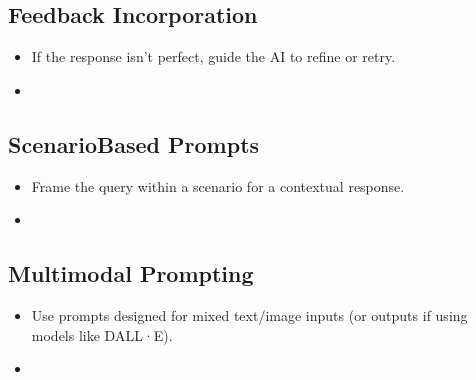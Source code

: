 \documentclass[letterpaper,11pt,english]{sphinxmanual}
\begin{document}
\subsection{Feedback Incorporation}
\label{\detokenize{prompt:feedback-incorporation}}\begin{itemize}
\item {} 
\sphinxAtStartPar
If the response isn’t perfect, guide the AI to refine or retry.

\item {} 
\sphinxAtStartPar
{}

\sphinxAtStartPar
{}

\end{itemize}


\subsection{Scenario\sphinxhyphen{}Based Prompts}
\label{\detokenize{prompt:scenario-based-prompts}}\begin{itemize}
\item {} 
\sphinxAtStartPar
Frame the query within a scenario for a contextual response.

\item {} 
\sphinxAtStartPar
{}

\sphinxAtStartPar
{}

\end{itemize}


\subsection{Multimodal Prompting}
\label{\detokenize{prompt:multimodal-prompting}}\begin{itemize}
\item {} 
\sphinxAtStartPar
Use prompts designed for mixed text/image inputs (or outputs if using models like DALL·E).

\item {} 
\sphinxAtStartPar
{}

\sphinxAtStartPar
{}

\end{itemize}
\end{document}
